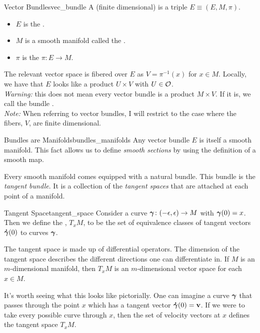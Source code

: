 \begin{df}{Vector Bundles}{vec_bundle}
A (finite dimensional)  is a triple $E\equiv (E,M,\pi)$.
\begin{itemize}
    \item $E$ is the .
    \item $M$ is a smooth manifold called the .
    \item $\pi$ is the  $\pi \colon E \to M$. 
\end{itemize}
The relevant vector space is fibered over $E$ as $V=\pi^{-1}(x)$ for $x\in M$. Locally, we have that $E$ looks like a product $U\times V$ with $U\in \mathcal{O}$. \\

\emph{Warning:} this does not mean every vector bundle is a product $M\times V$.  If it is, we call the bundle .  \\

\emph{Note:} When referring to vector bundles, I will restrict to the case where the fibers, $V$, are finite dimensional.
\end{df}

\begin{rmk}{Bundles are Manifolds}{bundles_manifolds}
Any vector bundle $E$ is itself a smooth manifold.  This fact allows us to define \emph{smooth sections} by using the definition of a smooth map.
\end{rmk}

Every smooth manifold comes equipped with a natural bundle.  This bundle is the \emph{tangent bundle}. It is a collection of the \emph{tangent spaces} that are attached at each point of a manifold.

\begin{df}{Tangent Space}{tangent_space}
Consider a curve $\boldsymbol{\gamma} \colon (-\epsilon,\epsilon)\to M$ with $\boldsymbol{\gamma}(0)=x$.  Then we define the , $T_xM$, to be the set of equivalence classes of tangent vectors $\boldsymbol{\dot{\gamma}}(0)$ to curves $\boldsymbol{\gamma}$. 
\end{df}
The tangent space is made up of differential operators.  The dimension of the tangent space describes the different directions one can differentiate in.  If $M$ is an $m$-dimensional manifold, then $T_xM$ is an $m$-dimensional vector space for each $x\in M$.

It's worth seeing what this looks like pictorially.  One can imagine a curve $\boldsymbol{\gamma}$ that passes through the point $x$ which has a tangent vector $\boldsymbol{\dot{\gamma}}(0)=\mathbf{v}$.  If we were to take every possible curve through $x$, then the set of velocity vectors at $x$ defines the tangent space $T_xM$.

